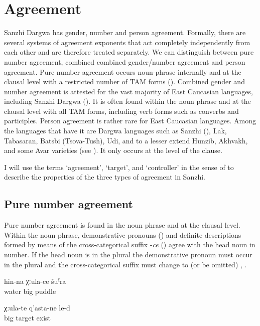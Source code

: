 \chapter{Agreement}
\label{cpt:Agreement}

Sanzhi Dargwa has gender, number and person agreement. Formally, there are several systems of agreement exponents that act completely independently from each other and are therefore treated separately. We can distinguish between pure number agreement, combined combined gender/number agreement and person agreement. Pure number agreement occurs noun-phrase internally and at the clausal level with a restricted number of TAM forms (). Combined gender and number agreement is attested for the vast majority of East Caucasian languages, including Sanzhi Dargwa (). It is often found within the noun phrase and at the clausal level with all TAM forms, including verb forms such as converbs and participles. Person agreement is rather rare for East Caucasian languages. Among the languages that have it are Dargwa languages such as Sanzhi (), Lak, Tabasaran, Batsbi (Tsova-Tush), Udi, and to a lesser extend Hunzib, Akhvakh, and some Avar varieties (see \citealp{Helmbrecht1996, vandenBerg1999, Schulze2007}). It only occurs at the level of the clause.

I will use the terms `agreement', `target', and `controller' in the sense of \citealp{Corbett2006} to describe the properties of the three types of agreement in Sanzhi.



\section{Pure number agreement}
\label{sec:Pure number agreement}
Pure number agreement is found in the noun phrase and at the clausal level. Within the noun phrase, demonstrative pronouns () and definite descriptions formed by means of the cross-categorical suffix -\textit{ce} () agree with the head noun in number. If the head noun is in the plural the demonstrative pronoun must occur in the plural and the cross-categorical suffix must change to  (or be omitted)  , .
%
\begin{exe}
	\ex	\label{ex:‎a big puddle of water}
	\gll	hin-na	χːula-ce	šuˁra\\
		water	big	puddle\\
	\glt	{}

	\ex	\label{ex:‎There are big targets}
	\gll	χːula-te	q'asta-ne	le-d\\
		big 	target	exist\\
	\glt	{}
\end{exe}

